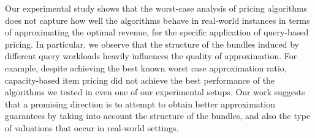 
Our experimental study shows that the worst-case analysis of pricing algorithms does not capture how well the algorithms behave in real-world instances in terms of approximating the optimal revenue, for the specific application of query-based pricing. In particular, we observe that the structure of the bundles induced by different query workloads heavily influences the quality of approximation. For example, despite achieving the best known worst case approximation ratio, capacity-based item pricing did not achieve the best performance of the algorithms we tested in even one of our experimental setups. Our work suggests that a promising direction is to attempt to obtain better approximation guarantees by taking into account the structure of the bundles, and also the type of valuations that occur in real-world settings.

